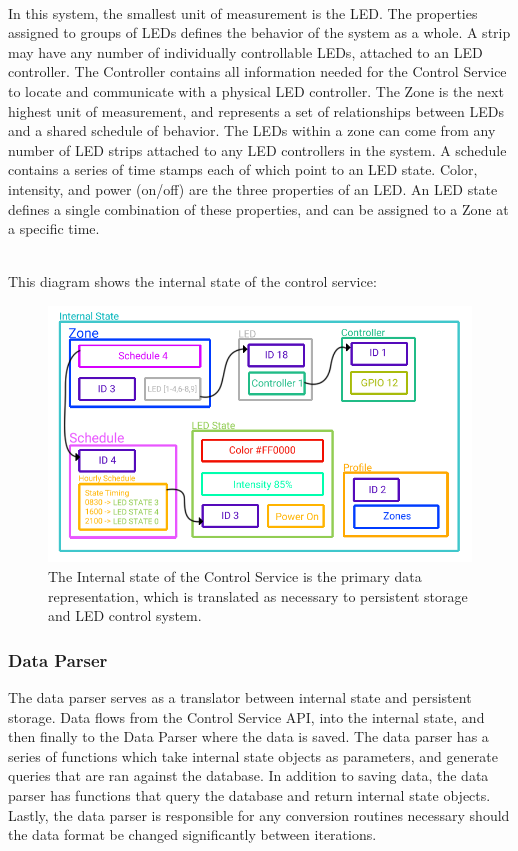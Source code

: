 \documentclass[onecolumn, draftclsnofoot,10pt, compsoc]{IEEEtran}
\begin{document}
			\noindent \\In this system, the smallest unit of measurement is the LED. The properties assigned to groups of LEDs defines the behavior of the system as a whole.
			A strip may have any number of individually controllable LEDs, attached to an LED controller.
			The Controller contains all information needed for the Control Service to locate and communicate with a physical LED controller.
			The Zone is the next highest unit of measurement, and represents a set of relationships between LEDs and a shared schedule of behavior.
			The LEDs within a zone can come from any number of LED strips attached to any LED controllers in the system.
			A schedule contains a series of time stamps each of which point to an LED state.
			Color, intensity, and power (on/off) are the three properties of an LED. An LED state defines a single combination of these properties, and can be assigned to a Zone at a specific time.


			\noindent \\This diagram shows the internal state of the control service:

			\begin{center}
				\begin{figure}[H]
					\includegraphics[width=\linewidth]{systemDiagrams/internalstate.png}
					\caption{The Internal state of the Control Service is the primary data representation, which is translated as necessary to persistent storage and LED control system.}
					\label{fig:internalStateDiagram}
				\end{figure}
			\end{center}

			\subsubsection{Data Parser}
			The data parser serves as a translator between internal state and persistent storage.
			Data flows from the Control Service API, into the internal state, and then finally to the Data Parser where the data is saved.
			The data parser has a series of functions which take internal state objects as parameters, and generate queries that are ran against the database.
			In addition to saving data, the data parser has functions that query the database and return internal state objects.
			Lastly, the data parser is responsible for any conversion routines necessary should the data format be changed significantly between iterations.
\end{document}

